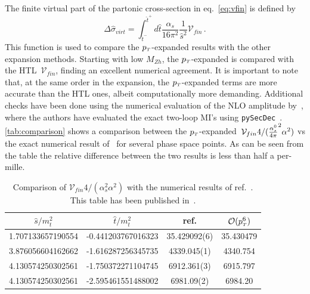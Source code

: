 The finite virtual part of the partonic cross-section in eq.~\eqref{eq:vfin} is defined  by
\begin{equation}
	\Delta \hat{\sigma}_{virt}=
	\int_{\hat{t}^-}^{\hat{t}^+} d\hat{t}
	\frac{\alpha_s}{16\pi^2}\frac{1}{\hat{s}^2}\mathcal{V}_{fin}\, .
	\label{eq:deltasigma}
\end{equation}
This function is used to compare the $p_{\scriptscriptstyle T}$-expanded results with the other expansion methods. Starting with low $M_{Zh}$, 
the $p_{\scriptscriptstyle T}$-expanded is compared with the HTL~$\mathcal{V}_{fin}$, finding an excellent numerical agreement.
It is important to note that, at the same order in the expansion, 
the $p_{\scriptscriptstyle T}$-expanded terms are more accurate than
the HTL ones, albeit computationally more demanding.  Additional checks have been done using the numerical evaluation of the NLO amplitude by~\cite{Chen:2020gae}, where the authors have evaluated the exact two-loop MI's using \texttt{pySecDec}~\cite{Borowka:2017idc, Borowka:2018goh}.  \autoref{tab:comparison} shows a comparison between the $p_{\scriptscriptstyle T}$-expanded~$\mathcal{V}_{fin} 4/(\frac{\alpha_s^0}{4 \pi}^2 \alpha^2)$ vs the exact numerical result of~\cite{Chen:2020gae} for several phase space points. 
As can be seen from the table the relative difference 
between the two results is less than half a per-mille.
\begin{table}
	\renewcommand{\arraystretch}{1.2}
	\centering
	\begin{tabular}{| c| c | c | c| } \hline
		\rowcolor{lightgray}  $\hat{s}/m_t^2$ & $\hat{t}/m_t^2$ &  ref.\cite{Chen:2020gae} & $\mathcal{O}(p_{\scriptscriptstyle T}^6)$  \\ \hline 
		\cellcolor{lightgray} 1.707133657190554 & \cellcolor{lightgray} -0.441203767016323 & 35.429092(6) & 35.430479 \\
		\cellcolor{lightgray} 3.876056604162662 & \cellcolor{lightgray} -1.616287256345735 & 4339.045(1) & 4340.754 \\
		\cellcolor{lightgray} 4.130574250302561 & \cellcolor{lightgray} -1.750372271104745 & 6912.361(3) & 6915.797 \\
		\cellcolor{lightgray} 4.130574250302561 & \cellcolor{lightgray} -2.595461551488002 & 6981.09(2) & 6984.20  \\ \hline
	\end{tabular}
	\caption{Comparison of $\mathcal{V}_{fin} 4/(\alpha_s^2 \alpha^2)$ with the numerical results of ref.~\cite{Chen:2020gae}. This table has been published in~\cite{Alasfar:2021ppe}. \label{tab:comparison}}
\end{table}
